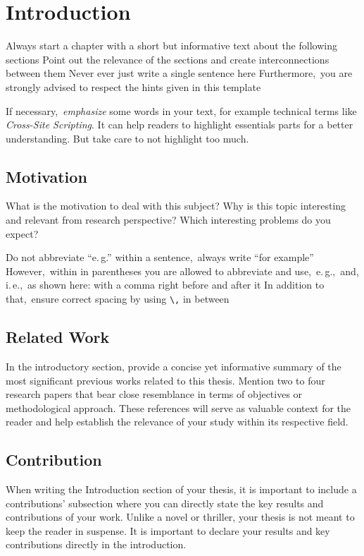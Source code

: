 \chapter{Introduction} \label{chap:intro}
Always start a chapter with a short but informative text about the following sections Point out the relevance of the sections and create interconnections between them Never ever just write a single sentence here Furthermore,\ you are strongly advised to respect the hints given in this template

If necessary,\ \emph{emphasize} some words in your text, for example technical terms like \emph{Cross-Site Scripting}.
It can help readers to highlight essentials parts for a better understanding.
But take care to not highlight too much.

\section{Motivation}
What is the motivation to deal with this subject?
Why is this topic interesting and relevant from research perspective?
Which interesting problems do you expect?

Do not abbreviate \enquote{e.\,g.\/} within a sentence,\ always write \enquote{for example} However,\ within in parentheses you are allowed to abbreviate and use,\ e.\,g.,\ and, i.\,e.,\ as shown here: with a comma right before and after it In addition to that,\ ensure correct spacing by using \texttt{\textbackslash,} in between

\section{Related Work}

In the introductory section, provide a concise yet informative summary of the most significant previous works related to this thesis. Mention two to four research papers that bear close resemblance in terms of objectives or methodological approach. These references will serve as valuable context for the reader and help establish the relevance of your study within its respective field.

\section{Contribution}
\label{sec:Contribution}

When writing the Introduction section of your thesis, it is important to include a contributions' subsection where you can directly state the key results and contributions of your work. Unlike a novel or thriller, your thesis is not meant to keep the reader in suspense. It is important to declare your results and key contributions directly in the introduction.

